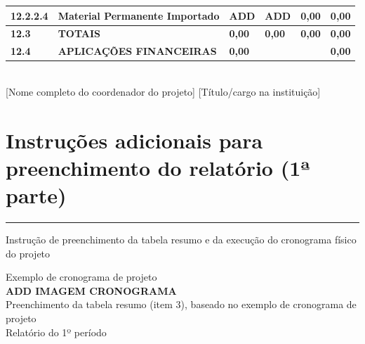 \documentclass[a4paper,12pt]{article}
\begin{document}
\begin{table}[h]
{\begin{tabular}{|l|l|l|l|l|l|}
    \rowcolor{Gainsboro!60}
    12.2.2.4 & 
    Material Permanente Importado & 
    ADD & 
    ADD &
    \textbf{0,00} &
    \textbf{0,00} \\ \hline

    \rowcolor{blue!40} \textbf{12.3} & 
    \textbf{TOTAIS} & 
    \textbf{0,00} & 
    \textbf{0,00} & 
    \textbf{0,00} & 
    \textbf{0,00} \\ \hline\hline

    \rowcolor{blue!40} \textbf{12.4} & 
    \textbf{APLICAÇÕES FINANCEIRAS} & 
    \multicolumn{3}{|l||}{\textbf{0,00}} & 
    \textbf{0,00} \\ \hline
    
\end{tabular}}
\end{table}


\vspace{1cm}


\vspace{1cm}
\underline{\hspace{10cm}} \\[1em] %
[Nome completo do coordenador do projeto] [Título/cargo na instituição]
\newpage

\section{Instruções adicionais para preenchimento do relatório (1ª parte)}
\vspace{-0.8cm} %
    \rule{\textwidth}{2pt} %

\raggedright Instrução de preenchimento da tabela resumo e da execução do cronograma físico do projeto

Exemplo de cronograma de projeto
\\[0.5cm] %
\textbf{ADD IMAGEM CRONOGRAMA}
\\[0.5cm] %
Preenchimento da tabela resumo (item 3), baseado no exemplo de cronograma de projeto
\\[0.5cm] %
Relatório do 1º período
\end{document}
